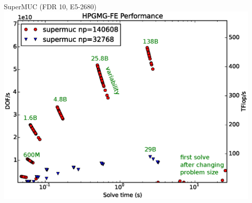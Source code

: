 \documentclass{beamer}
\begin{document}

\begin{frame}{SuperMUC (FDR 10, E5-2680)}
  \includegraphics[width=\textwidth]{figures/hpgmg/range-supermuc-ann.eps}
\end{frame}
\end{document}
